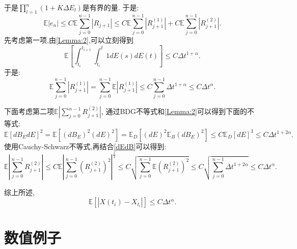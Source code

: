 \documentclass[12pt,final]{article}
\makeatletter
\numberwithin{equation}{section}
\numberwithin{figure}{section}
\numberwithin{table}{section}
\theoremstyle{plain}
\renewcommand{\proofname}{证明}
\theoremstyle{Definition}
\theoremstyle{Remark}
\renewenvironment{proof}[1][\proofname]{\par
	\pushQED{\qed}%
	\normalfont \topsep6\p@\@plus6\p@\relax
	\trivlist\item[\hskip\labelsep
	\bfseries #1\@addpunct{\,:\,}]\ignorespaces
}{%
	\popQED\endtrivlist\@endpefalse
}
\makeatother
\begin{document}
\begin{proof}
		于是$\prod\limits_{l=1}^{n}(1+K\Delta E_l)$是有界的量. 于是:
		\begin{equation}
			\mathbb{E}|e_n| \leq C\mathbb{E}\sum_{j=0}^{n-1}|R_{j+1}| \leq C\mathbb{E}\sum\limits_{j=0}^{n-1}|R_{j+1}^{(1)}| + C\mathbb{E}\sum\limits_{j=0}^{n-1}|R_{j+1}^{(2)}|.
		\end{equation}
		先考虑第一项,由\cref{Lemma:2},可以立刻得到
		\begin{equation}
			\mathbb{E} \left[ \int_{t_i}^{t_{i+1}}\int_{t_i}^{t}1dE(s)dE(t) \right] \le C\Delta t^{1+\alpha}.
		\end{equation}
		于是:
		\begin{equation}
			\mathbb{E}\sum\limits_{j=0}^{n-1}|R_{j+1}^{(1)}|= \sum\limits_{j=0}^{n-1}\mathbb{E}|R_{j+1}^{(1)}| \leq
			C\sum\limits_{j=0}^{n-1}\Delta t^{1+\alpha} \le C\Delta t^\alpha.
		\end{equation}

		下面考虑第二项$\mathbb{E}|\sum\limits_{j=0}^{n-1}R_{j+1}^{(2)}|$,
		通过BDG不等式和\cref{Lemma:2}可以得到下面的不等式:
		\begin{equation}\label{dEdB}
			\mathbb{E}[dB_EdE]^2=\mathbb{E}[(dB_E)^2(dE)^2]=\mathbb{E}_D[(dE)^2\mathbb{E}_B(dB_E)^2]\leq
			C\mathbb{E}_{D}[dE]^3\leq C\Delta t ^{1+2\alpha}.
		\end{equation}
		使用Cauchy-Schwarz不等式,再结合\cref{dEdB}可以得到:
		\begin{equation*}
			\mathbb{E}\left|\sum_{j=0}^{n-1}R_{j+1}^{(2)}\right|  \le C\mathbb{E} \left|\sum_{j=0}^{n-1}(R_{j+1}^{(2)})^2\right|^{\frac{1}{2}} \le C\sqrt{\sum_{j=0}^{n-1}\mathbb{E}(R_{j+1}^{(2)})^2}
			\le C\sqrt{\sum_{j=0}^{n-1}\Delta t^{1+2\alpha}} \le C\Delta t^{\alpha}.
		\end{equation*}

		综上所述,$$\mathbb{E}[|X({t_i})-X_{t_i}|]\le C\Delta t^\alpha.$$
	\end{proof}
	
	\section{数值例子}

	
	
\end{document}
